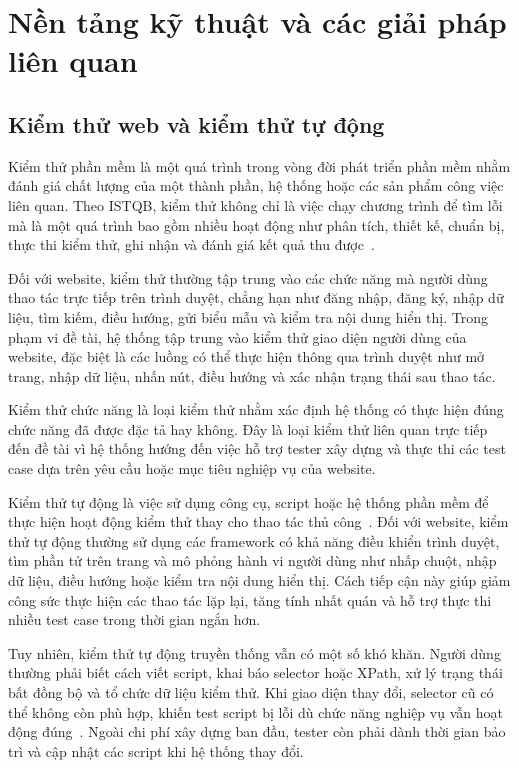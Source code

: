 \chapter{Nền tảng kỹ thuật và các giải pháp liên quan}
\label{Chapter2}

\section{Kiểm thử web và kiểm thử tự động}

Kiểm thử phần mềm là một quá trình trong vòng đời phát triển phần mềm nhằm đánh giá chất lượng của một thành phần, hệ thống hoặc các sản phẩm công việc liên quan. Theo ISTQB, kiểm thử không chỉ là việc chạy chương trình để tìm lỗi mà là một quá trình bao gồm nhiều hoạt động như phân tích, thiết kế, chuẩn bị, thực thi kiểm thử, ghi nhận và đánh giá kết quả thu được~\cite{istqb_testing,istqb_ctfl_v4}.

Đối với website, kiểm thử thường tập trung vào các chức năng mà người dùng thao tác trực tiếp trên trình duyệt, chẳng hạn như đăng nhập, đăng ký, nhập dữ liệu, tìm kiếm, điều hướng, gửi biểu mẫu và kiểm tra nội dung hiển thị. Trong phạm vi đề tài, hệ thống tập trung vào kiểm thử giao diện người dùng của website, đặc biệt là các luồng có thể thực hiện thông qua trình duyệt như mở trang, nhập dữ liệu, nhấn nút, điều hướng và xác nhận trạng thái sau thao tác.

Kiểm thử chức năng là loại kiểm thử nhằm xác định hệ thống có thực hiện đúng chức năng đã được đặc tả hay không. Đây là loại kiểm thử liên quan trực tiếp đến đề tài vì hệ thống hướng đến việc hỗ trợ tester xây dựng và thực thi các test case dựa trên yêu cầu hoặc mục tiêu nghiệp vụ của website.

Kiểm thử tự động là việc sử dụng công cụ, script hoặc hệ thống phần mềm để thực hiện hoạt động kiểm thử thay cho thao tác thủ công~\cite{istqb_ctfl_v4}. Đối với website, kiểm thử tự động thường sử dụng các framework có khả năng điều khiển trình duyệt, tìm phần tử trên trang và mô phỏng hành vi người dùng như nhấp chuột, nhập dữ liệu, điều hướng hoặc kiểm tra nội dung hiển thị. Cách tiếp cận này giúp giảm công sức thực hiện các thao tác lặp lại, tăng tính nhất quán và hỗ trợ thực thi nhiều test case trong thời gian ngắn hơn.

Tuy nhiên, kiểm thử tự động truyền thống vẫn có một số khó khăn. Người dùng thường phải biết cách viết script, khai báo selector hoặc XPath, xử lý trạng thái bất đồng bộ và tổ chức dữ liệu kiểm thử. Khi giao diện thay đổi, selector cũ có thể không còn phù hợp, khiến test script bị lỗi dù chức năng nghiệp vụ vẫn hoạt động đúng~\cite{9402129}. Ngoài chi phí xây dựng ban đầu, tester còn phải dành thời gian bảo trì và cập nhật các script khi hệ thống thay đổi.

